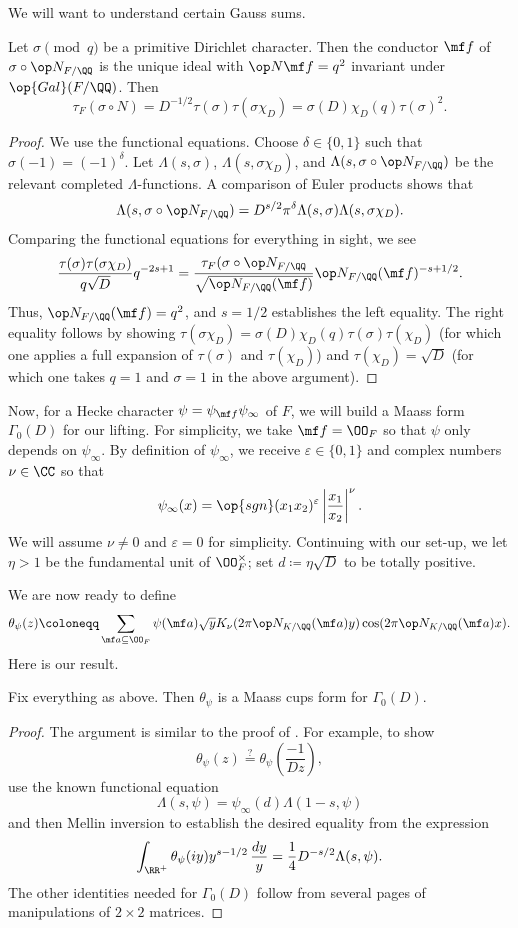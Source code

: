 \documentclass{article}
\begin{document}
We will want to understand certain Gauss sums.
\begin{proposition}
	Let $\sigma\pmod q$ be a primitive Dirichlet character. Then the conductor $\mf f$ of $\sigma\circ\op N_{F/\QQ}$ is the unique ideal with $\op N\mf f=q^2$ invariant under $\op{Gal}(F/\QQ)$. Then
	\[\tau_F(\sigma\circ N)=D^{-1/2}\tau(\sigma)\tau(\sigma\chi_D)=\sigma(D)\chi_D(q)\tau(\sigma)^2.\]
\end{proposition}
\begin{proof}
	We use the functional equations. Choose $\delta\in\{0,1\}$ such that $\sigma(-1)=(-1)^\delta$. Let $\Lambda(s,\sigma)$, $\Lambda(s,\sigma\chi_D)$, and $\Lambda(s,\sigma\circ{\op N_{F/\QQ}})$ be the relevant completed $\Lambda$-functions. A comparison of Euler products shows that
	\[\Lambda(s,{\sigma\circ\op N_{F/\QQ}})=D^{s/2}\pi^\delta\Lambda(s,\sigma)\Lambda(s,\sigma\chi_D).\]
	Comparing the functional equations for everything in sight, we see
	\[\frac{\tau(\sigma)\tau(\sigma\chi_D)}{q\sqrt D}q^{-2s+1}=\frac{\tau_F(\sigma\circ{\op N_{F/\QQ}}}{\sqrt{\op N_{F/\QQ}(\mf f)}}\op N_{F/\QQ}(\mf f)^{-s+1/2}.\]
	Thus, $\op N_{F/\QQ}(\mf f)=q^2$, and $s=1/2$ establishes the left equality. The right equality follows by showing $\tau(\sigma\chi_D)=\sigma(D)\chi_D(q)\tau(\sigma)\tau(\chi_D)$ (for which one applies a full expansion of $\tau(\sigma)$ and $\tau(\chi_D)$) and $\tau(\chi_D)=\sqrt D$ (for which one takes $q=1$ and $\sigma=1$ in the above argument).
\end{proof}
Now, for a Hecke character $\psi=\psi_{\mf f}\psi_\infty$ of $F$, we will build a Maass form $\Gamma_0(D)$ for our lifting. For simplicity, we take $\mf f=\OO_F$ so that $\psi$ only depends on $\psi_\infty$. By definition of $\psi_\infty$, we receive $\varepsilon\in\{0,1\}$ and complex numbers $\nu\in\CC$ so that
\[\psi_\infty(x)=\op{sgn}(x_1x_2)^{\varepsilon}\left|\frac{x_1}{x_2}\right|^\nu.\]
We will assume $\nu\ne0$ and $\varepsilon=0$ for simplicity. Continuing with our set-up, we let $\eta>1$ be the fundamental unit of $\OO_F^\times$; set $d\coloneqq\eta\sqrt D$ to be totally positive.

We are now ready to define
\[\theta_\psi(z)\coloneqq\sum_{\mf a\subseteq\OO_F}\psi(\mf a)\sqrt yK_\nu(2\pi\op N_{K/\QQ}(\mf a)y)\cos(2\pi\op N_{K/\QQ}(\mf a)x).\]
Here is our result.
\begin{theorem}
	Fix everything as above. Then $\theta_\psi$ is a Maass cups form for $\Gamma_0(D)$.
\end{theorem}
\begin{proof}
	The argument is similar to the proof of . For example, to show
	\[\theta_\psi(z)\stackrel?=\theta_\psi\left(\frac{-1}{Dz}\right),\]
	use the known functional equation
	\[\Lambda(s,\psi)=\psi_\infty(d)\Lambda(1-s,\psi)\]
	and then Mellin inversion to establish the desired equality from the expression
	\[\int_{\RR^+}\theta_\psi(iy)y^{s-1/2}\,\frac{dy}y=\frac14D^{-s/2}\Lambda(s,\psi).\]
	The other identities needed for $\Gamma_0(D)$ follow from several pages of manipulations of $2\times2$ matrices.
\end{proof}
\end{document}
